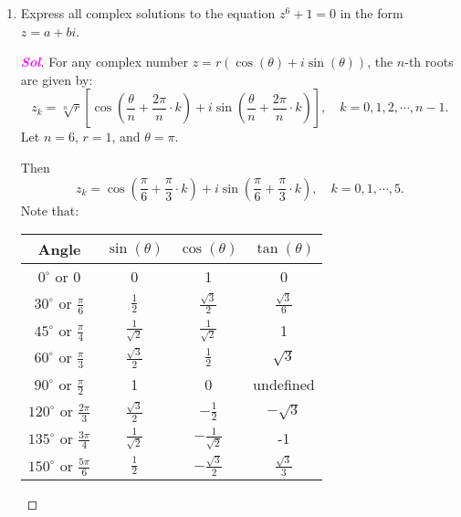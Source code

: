 \documentclass{article}
\theoremstyle{definition}
\newcommand{\of}[1]{\left( #1 \right)}
\newcommand{\sol}{\textcolor{magenta}{\bf Sol}}
\renewcommand{\Re}{\operatorname{Re}}
\renewcommand{\Im}{\operatorname{Im}}
\begin{document}
\begin{enumerate}
	\item  Express all complex solutions to the equation $z^6 + 1 = 0$ in the form $z = a + bi$.
	\begin{proof}[\sol]
		For any complex number $z = r(\cos(\theta) + i\sin(\theta))$, the $n$-th roots are given by: \[
		z_k=\sqrt[n]{r}\left[\cos\of{\frac{\theta}{n}+\frac{2\pi}{n}\cdot k}+i\sin\of{\frac{\theta}{n}+\frac{2\pi}{n}\cdot k}\right],\quad k=0,1,2,\cdots,n-1.
		\] Let $n=6$, $r=1$, and $\theta = \pi$.
		\iffalse
		because \begin{center}
			\begin{center}
				\begin{tikzpicture}
					\draw[thick,->] (-1.5,0) -- (1.5,0) node[below] {$\Re$};
					\draw[thick,->] (0,-1.5) -- (0,1.5) node[left] {$\Im$};
					
					\draw[dashed, thick, red] (0,0) -- (-1,0) node[midway, above, black] {$1$};
					\draw[fill, red] (-1,0) circle (1.5pt) node[below left] {$-1$};
					\draw[->, thick, orange] (0.3,0) arc (0:180:0.3) node[midway, right, black] {$\pi$};
					\draw (0,0) circle (1);
				\end{tikzpicture}
			\end{center}
		\end{center}
		\fi
		Then \[
		z_k=\cos\of{\frac{\pi}{6}+\frac{\pi}{3}\cdot k}+i\sin\of{\frac{\pi}{6}+\frac{\pi}{3}\cdot k},\quad k=0,1,\cdots, 5.
		\]
		Note that: \begin{table}[ht!]
			\centering
			\begin{tabular}{c||c|c|c}
				\toprule
				Angle & $\sin(\theta)$ & $\cos(\theta)$ & $\tan(\theta)$ \\
				\midrule
				$0^\circ$ or $0$ & 0 & 1 & 0 \\
				$30^\circ$ or $\frac{\pi}{6}$ & $\frac{1}{2}$ & $\frac{\sqrt{3}}{2}$ & $\frac{\sqrt{3}}{6}$ \\
				$45^\circ$ or $\frac{\pi}{4}$ & $\frac{1}{\sqrt{2}}$ & $\frac{1}{\sqrt{2}}$ & 1 \\
				$60^\circ$ or $\frac{\pi}{3}$ & $\frac{\sqrt{3}}{2}$ & $\frac{1}{2}$ & $\sqrt{3}$ \\
				\hline
				$90^\circ$ or $\frac{\pi}{2}$ & 1 & 0 & undefined \\
				\hline
				$120^\circ$ or $\frac{2\pi}{3}$ & $\frac{\sqrt{3}}{2}$ & $-\frac{1}{2}$ & $-\sqrt{3}$ \\
				$135^\circ$ or $\frac{3\pi}{4}$ & $\frac{1}{\sqrt{2}}$ & $-\frac{1}{\sqrt{2}}$ & -1 \\
				$150^\circ$ or $\frac{5\pi}{6}$ & $\frac{1}{2}$ & $-\frac{\sqrt{3}}{2}$ & $\frac{\sqrt{3}}{3}$ \\

\end{tabular}
\end{table}
\end{proof}
\end{enumerate}
\end{document}
